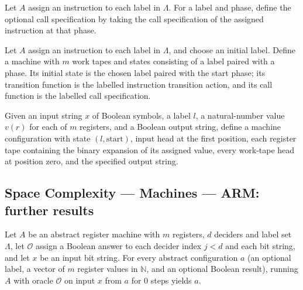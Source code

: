 \begin{definition}
\label{Complexity.LogProg.armCall}
\leanok
{}
Let $A$ assign an instruction to each label in $\Lambda$. For a label and phase, define
the optional call specification by taking the call specification of the assigned
instruction at that phase.
\end{definition}

\begin{definition}
\label{Complexity.LogProg.armProg}
\leanok
{}
Let $A$ assign an instruction to each label in $\Lambda$, and choose an initial label.
Define a machine with $m$ work tapes and states consisting of a label paired with a
phase. Its initial state is the chosen label paired with the start phase; its transition
function is the labelled instruction transition action, and its call function is the
labelled call specification.
\end{definition}

\begin{definition}
\label{Complexity.LogProg.aseam}
\leanok
{}
Given an input string $x$ of Boolean symbols, a label $l$, a natural-number value $v(r)$
for each of $m$ registers, and a Boolean output string, define a machine configuration
with state $(l,\mathrm{start})$, input head at the first position, each register tape
containing the binary expansion of its assigned value, every work-tape head at position
zero, and the specified output string.
\end{definition}

\subsection*{Space Complexity --- Machines --- ARM: further results}

\begin{lemma}
\label{Complexity.LogProg.arun_zero}
\leanok
{}
Let $A$ be an abstract register machine with $m$ registers, $d$ deciders and label set
$\Lambda$, let $\mathcal{O}$ assign a Boolean answer to each decider index $j<d$ and each
bit string, and let $x$ be an input bit string. For every abstract configuration $a$ (an
optional label, a vector of $m$ register values in $\mathbb{N}$, and an optional Boolean
result), running $A$ with oracle $\mathcal{O}$ on input $x$ from $a$ for $0$ steps
yields $a$.
\end{lemma}

